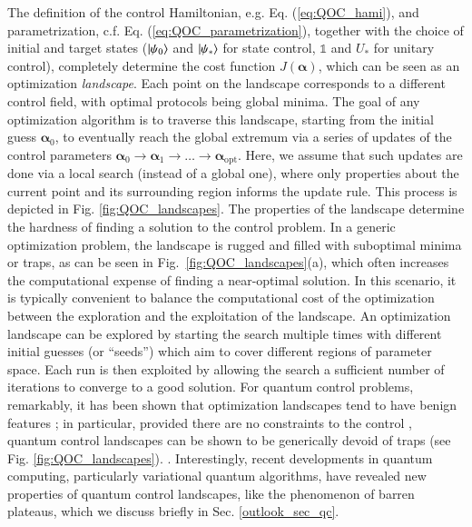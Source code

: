 The definition of the control Hamiltonian, e.g. Eq. (\ref{eq:QOC_hami}), and parametrization, c.f. Eq. (\ref{eq:QOC_parametrization}), together with the choice of initial and target states ($\ket{\psi_0}$ and $\ket{\psi_\ast}$ for state control, $\mathds{1}$ and $U_\ast$ for unitary control), completely determine the cost function $J(\bm{\alpha})$, which can be seen as an optimization \textit{landscape}. Each point on the landscape corresponds to a different control field, with optimal protocols being global minima. The goal of any optimization algorithm is to traverse this landscape, starting from the initial guess $\bm{\alpha}_0$, to eventually reach the global extremum via a series of updates of the control parameters $\bm{\alpha}_0\rightarrow\bm{\alpha}_1\rightarrow \ldots \rightarrow \bm{\alpha}_{\text{opt}}$. Here, we assume that such updates are done via a local search (instead of a global one), where only properties about the current point and its surrounding region informs the update rule. This process is depicted in Fig. \ref{fig:QOC_landscapes}. The properties of the landscape determine the hardness of finding a solution to the control problem. In a generic optimization problem, the landscape is rugged and filled with suboptimal minima or traps, as can be seen in Fig.~\ref{fig:QOC_landscapes}(a), which often increases the computational expense of finding a near-optimal solution. In this scenario, it is typically convenient to balance the computational cost of the optimization between the exploration and the exploitation of the landscape. An optimization landscape can be explored by starting the search multiple times with different initial guesses (or ``seeds'') which aim to cover different regions of parameter space. Each run is then exploited by allowing the search a sufficient number of iterations to converge to a good solution.  For quantum control problems, remarkably, it has been shown that optimization landscapes tend to have benign features \cite{rabitz2004}; in particular, provided there are no constraints to the control  \cite{zhdanov2015}, quantum control landscapes can be shown to be generically devoid of traps  (see Fig. \ref{fig:QOC_landscapes}). . 
Interestingly, recent developments in quantum computing, particularly variational quantum algorithms, have revealed new properties of quantum control landscapes, like the phenomenon of barren plateaus, which we discuss briefly in Sec. \ref{outlook_sec_qc}.

